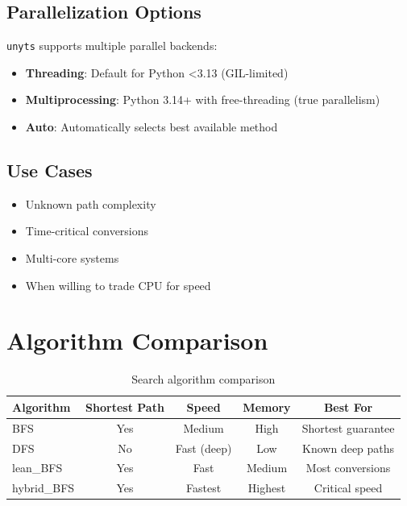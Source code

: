 \documentclass[11pt,a4paper]{report}
\begin{document}
\subsection{Parallelization Options}

\texttt{unyts} supports multiple parallel backends:
\begin{itemize}[leftmargin=*]
  \item \textbf{Threading}: Default for Python <3.13 (GIL-limited)
  \item \textbf{Multiprocessing}: Python 3.14+ with free-threading (true parallelism)
  \item \textbf{Auto}: Automatically selects best available method
\end{itemize}

\subsection{Use Cases}

\begin{itemize}[leftmargin=*]
  \item Unknown path complexity
  \item Time-critical conversions
  \item Multi-core systems
  \item When willing to trade CPU for speed
\end{itemize}

\section{Algorithm Comparison}

\begin{table}[h]
\centering
\begin{tabular}{@{}lcccc@{}}
\toprule
\textbf{Algorithm} & \textbf{Shortest Path} & \textbf{Speed} & \textbf{Memory} & \textbf{Best For} \\
\midrule
BFS & Yes & Medium & High & Shortest guarantee \\
DFS & No & Fast (deep) & Low & Known deep paths \\
lean\_BFS & Yes & Fast & Medium & Most conversions \\
hybrid\_BFS & Yes & Fastest & Highest & Critical speed \\
\bottomrule
\end{tabular}
\caption{Search algorithm comparison}
\label{tab:algorithm_comparison}
\end{table}
\end{document}
